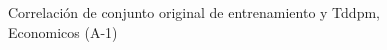 \begin{figure}[H]
    \centering
    
    \caption{Correlación de conjunto original de entrenamiento y Tddpm, Economicos (A-1)}
    \label{pairwise-economicos-a-1-tddpm_mlp}
\end{figure}